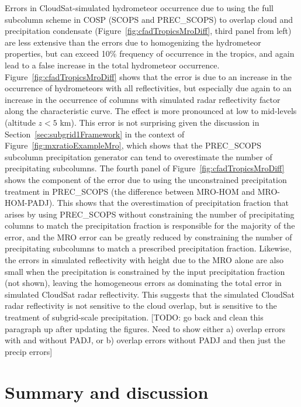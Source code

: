 Errors in CloudSat-simulated hydrometeor occurrence due to using the
full subcolumn scheme in COSP (SCOPS and PREC\_SCOPS) to overlap cloud
and precipitation condensate (Figure~\ref{fig:cfadTropicsMroDiff}, third
panel from left) are less extensive than the errors due to homogenizing
the hydrometeor properties, but can exceed 10\% frequency of occurrence
in the tropics, and again lead to a false increase in the total
hydrometeor occurrence. Figure~\ref{fig:cfadTropicsMroDiff} shows that
the error is due to an increase in the occurrence of hydrometeors with
all reflectivities, but especially due again to an increase in the
occurrence of columns with simulated radar reflectivity factor along the
characteristic curve. The effect is more pronounced at low to mid-levels
(altitude \(z < 5\) km). This error is not surprising given the
discussion in Section~\ref{sec:subgrid1Framework} in the context of
Figure~\ref{fig:mxratioExampleMro}, which shows that the PREC\_SCOPS
subcolumn precipitation generator can tend to overestimate the number of
precipitating subcolumns. The fourth panel of
Figure~\ref{fig:cfadTropicsMroDiff} shows the component of the error due
to using the unconstrained precipitation treatment in PREC\_SCOPS (the
difference between MRO-HOM and MRO-HOM-PADJ). This shows that the
overestimation of precipitation fraction that arises by using
PREC\_SCOPS without constraining the number of precipitating columns to
match the precipitation fraction is responsible for the majority of the
error, and the MRO error can be greatly reduced by constraining the
number of precipitating subcolumns to match a prescribed precipitation
fraction. Likewise, the errors in simulated reflectivity with height due
to the MRO alone are also small when the precipitation is constrained by
the input precipitation fraction (not shown), leaving the homogeneous
errors as dominating the total error in simulated CloudSat radar
reflectivity. This suggests that the simulated CloudSat radar
reflectivity is not sensitive to the cloud overlap, but is sensitive to
the treatment of subgrid-scale precipitation. {[}TODO: go back and clean
this paragraph up after updating the figures. Need to show either a)
overlap errors with and without PADJ, or b) overlap errors without PADJ
and then just the precip errors{]}

\section{Summary and discussion}\label{sec:subgrid1Summary}

